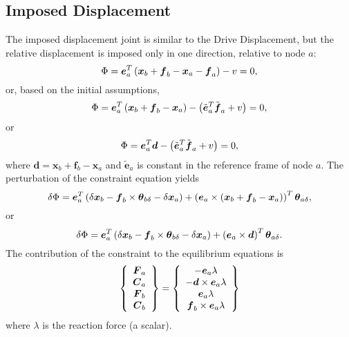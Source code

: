 \documentclass[10pt,dvips,fleqn]{report}
\newcommand{\T}[1]{\boldsymbol{#1}}
\begin{document}
\subsection{Imposed Displacement}
The imposed displacement joint is similar to the Drive Displacement,
but the relative displacement is imposed only in one direction,
relative to node $a$:
\begin{equation}
	\Phi = \T{e}_a^T \plbr{\T{x}_b + \T{f}_b - \T{x}_a - \T{f}_a} - v = 0 ,
\end{equation}
or, based on the initial assumptions,
\begin{equation}
	\Phi = \T{e}_a^T \plbr{\T{x}_b + \T{f}_b - \T{x}_a}
		- \plbr{\tilde{\T{e}}_a^T \tilde{\T{f}}_a + v} = 0 ,
\end{equation}
or
\begin{equation}
	\Phi = \T{e}_a^T \T{d}
		- \plbr{\tilde{\T{e}}_a^T \tilde{\T{f}}_a + v} = 0 ,
\end{equation}
where $\T{d}=\T{x}_b + \T{f}_b - \T{x}_a$ 
and $\tilde{\T{e}}_a$ is constant in the reference frame of node $a$.
The perturbation of the constraint equation yields
\begin{equation}
	\delta\Phi = 
		\T{e}_a^T \plbr{\delta\T{x}_b
		- \T{f}_b\times\T{\theta}_{b\delta}
		- \delta\T{x}_a
		} + \plbr{\T{e}_a \times \plbr{
			\T{x}_b + \T{f}_b - \T{x}_a
		}}^T \T{\theta}_{a\delta} ,
\end{equation}
or
\begin{equation}
	\delta\Phi = 
		\T{e}_a^T \plbr{\delta\T{x}_b
		- \T{f}_b\times\T{\theta}_{b\delta}
		- \delta\T{x}_a
		} + \plbr{\T{e}_a \times \T{d}}^T \T{\theta}_{a\delta} .
\end{equation}
The contribution of the constraint to the equilibrium equations is
\begin{equation}
	\cubr{\cvvect{
		\T{F}_a \\
		\T{C}_a \\
		\T{F}_b \\
		\T{C}_b
	}} = \cubr{\cvvect{
		- \T{e}_a \lambda \\
		- \T{d} \times \T{e}_a \lambda \\
		\T{e}_a \lambda \\
		\T{f}_b \times \T{e}_a \lambda
	}}
\end{equation}
where $\lambda$ is the reaction force (a scalar).
\end{document}
